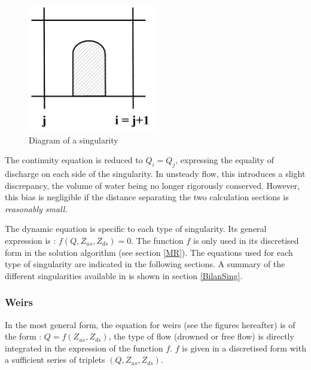 \begin{figure}[H]
 \begin{center}
  \includegraphics[width=0.5\textwidth]{Figures/Schema_Singularite.png}
  \caption{Diagram of a singularity}
  \label{fig:SchemSing}
 \end{center}
\end{figure}

The continuity equation is reduced to $Q_i = Q_j$, expressing the equality of discharge on each side of the singularity. In unsteady flow, this introduces a slight discrepancy, the volume of water being no longer rigorously conserved. However, this bias is negligible if the distance separating the two calculation sections is \textit{reasonably small}.

The dynamic equation is specific to each type of singularity. Its general expression is : $f(Q, Z_{us},Z_{ds}) = 0$.
The function $f$ is only used in its discretised form in the solution algorithm (see section \ref{MR}).
The equations used for each type of singularity are indicated in the following sections. A summary of the different singularities available in \mascaret{} is shown in section \ref{BilanSing}.

\subsubsection{Weirs}

In the most general form, the equation for weirs (see the figures hereafter) is of the form : $Q = f(Z_{us},Z_{ds})$, the type of flow (drowned or free flow) is directly integrated in the expression of the function $f$.
$f$ is given in a discretised form with a sufficient series of triplets $(Q,Z_{us},Z_{ds})$.

